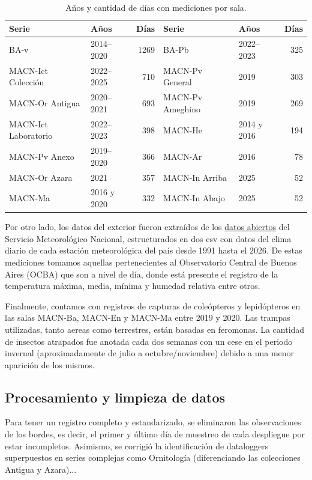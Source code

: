 \documentclass[11pt,a4paper]{article}
\begin{document}
\begin{table}[ht]
\centering
\begin{tabular}{llr @{\hspace{2em}} llr}
\toprule
\textbf{Serie} & \textbf{Años} & \textbf{Días} & \textbf{Serie} & \textbf{Años} & \textbf{Días} \\
\midrule
BA-v              & 2014--2020  & 1269 & BA-Pb          & 2022--2023  & 325 \\
MACN-Ict Colección  & 2022--2025  & 710  & MACN-Pv General  & 2019        & 303 \\
MACN-Or Antigua   & 2020--2021  & 693  & MACN-Pv Ameghino & 2019        & 269 \\
MACN-Ict Laboratorio & 2022--2023 & 398  & MACN-He        & 2014 y 2016 & 194 \\
MACN-Pv Anexo     & 2019--2020  & 366  & MACN-Ar        & 2016        & 78  \\
MACN-Or Azara     & 2021        & 357  & MACN-In Arriba & 2025        & 52  \\
MACN-Ma           & 2016 y 2020 & 332  & MACN-In Abajo  & 2025        & 52  \\
\bottomrule
\end{tabular}
\caption{Años y cantidad de días con mediciones por sala.}
\label{tab:años_por_sala}
\end{table}

Por otro lado, los datos del exterior fueron extraídos de los \href{https://www.smn.gob.ar/descarga-de-datos}{datos abiertos} del Servicio Meteorológico Nacional, estructurados en dos csv con datos del clima diario de cada estación meteorológica del país desde 1991 hasta el 2026. De estas mediciones tomamos aquellas pertenecientes al Observatorio Central de Buenos Aires (OCBA) que son a nivel de día, donde está presente el registro de la temperatura máxima, media, mínima y humedad relativa entre otros. 

Finalmente, contamos con registros de capturas de coleópteros y lepidópteros en las salas MACN-Ba, MACN-En y MACN-Ma entre 2019 y 2020. Las trampas utilizadas, tanto aereas como terrestres, están basadas en feromonas. La cantidad de insectos atrapados fue anotada cada dos semanas con un cese en el periodo invernal (aproximadamente de julio a octubre/noviembre) debido a una menor aparición de los mismos.

\subsection{Procesamiento y limpieza de datos}
Para tener un registro completo y estandarizado, se eliminaron las observaciones de los bordes, es decir, el primer y último día de muestreo de cada despliegue por estar incompletos. Asimismo, se corrigió la identificación de dataloggers superpuestos en series complejas como Ornitología (diferenciando las colecciones Antigua y Azara)...
\end{document}
